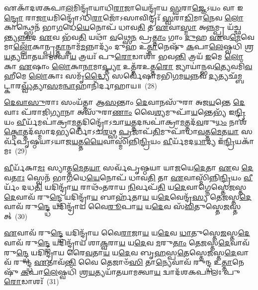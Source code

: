 𑌏𑌕𑌾᳴\-𑌦𑌶\-𑌕𑌪𑌾\-\ul{𑌲}\-𑌮𑌿𑌨𑍍𑌦𑍍𑌰𑌾᳴𑌯𑌾𑌧𑌿\-\ul{𑌰𑌾}\-𑌜𑌾𑌯𑍇𑌨𑍍𑌦𑍍𑌰𑌾᳴𑌯 \ul{𑌸𑍍𑌵}\-𑌰𑌾\-\ul{𑌜𑍍𑌞𑍇}\-\-𑌽𑌯𑌂 𑌵𑌾 𑌇\-\ul{𑌨𑍍𑌦𑍍𑌰𑍋} 𑌰𑌾\-\ul{𑌜𑌾}\-𑌯𑌮𑌿𑌨𑍍𑌦𑍍𑌰𑍋᳴\-𑌽𑌧𑌿\-\ul{𑌰𑌾}\-𑌜𑍋᳴\-𑌽𑌸𑌾𑌵𑌿𑌨𑍍𑌦𑍍𑌰𑌃᳴ \ul{𑌸𑍍𑌵}\-𑌰𑌾\-\ul{𑌡𑌿}\-𑌮𑌾\-\ul{𑌨𑍇}\-𑌵 \ul{𑌲𑍋}\-𑌕𑌾𑌨𑍍𑌥𑍍𑌸𑍍𑌵𑍇𑌨᳴ 𑌭𑌾\-\ul{𑌗}\-𑌧𑍇\-\ul{𑌯𑍇}\-𑌨𑍋𑌪᳴ 𑌧𑌾𑌵\-\ul{𑌤𑌿} 𑌤 \ul{𑌏}\-𑌵𑌾\-\ul{𑌸𑍍𑌮𑌾} 𑌅\-\ul{𑌨𑍍𑌨}\-𑌮𑍍𑌪𑍍𑌰 𑌯᳴𑌚𑍍𑌛𑌨𑍍𑌤𑍍𑌯\-\ul{𑌨𑍍𑌨𑌾}\-𑌦 \ul{𑌏}\-𑌵 𑌭᳴𑌵\-\ul{𑌤𑌿} 𑌯𑌥𑌾᳴ \ul{𑌵}\-𑌥𑍍𑌸𑍇\-\ul{𑌨} 𑌪𑍍𑌰\-\ul{𑌤𑍍𑌤𑌾𑌂} 𑌗𑌾𑌂 \ul{𑌦𑍁}\-𑌹 \ul{𑌏}\-𑌵\-\ul{𑌮𑍇}\-𑌵𑍇𑌮𑌾\-\ul{𑌲𑍍𑌲𑍋𑌁}\-𑌕𑌾𑌨𑍍𑌪𑍍𑌰\-\ul{𑌤𑍍𑌤𑌾}\-𑌨𑍍𑌕𑌾𑌮᳴\-\ul{𑌮}\-𑌨𑍍𑌨𑌾𑌦𑍍𑌯𑌂᳴ 𑌦𑍁𑌹 𑌉\-\ul{𑌤𑍍𑌤𑌾}\-𑌨𑍇𑌷𑍁᳴ \ul{𑌕}\-𑌪𑌾\-\ul{𑌲𑍇}\-𑌷𑍍𑌵𑌧𑌿᳴ 𑌶𑍍𑌰\-\ul{𑌯}\-𑌤𑍍𑌯𑌯𑌾᳴𑌤𑌯𑌾𑌮𑌤𑍍𑌵𑌾\-\ul{𑌯} 𑌤𑍍𑌰𑌯𑌃᳴ 𑌪𑍁\-\ul{𑌰𑍋}\-𑌡𑌾𑌶𑌾᳴ 𑌭𑌵\-\ul{𑌨𑍍𑌤𑌿} 𑌤𑍍𑌰𑌯᳴ \ul{𑌇}\-𑌮𑍇 \ul{𑌲𑍋}\-𑌕𑌾 \ul{𑌏}\-𑌷𑌾𑌂 \ul{𑌲𑍋}\-𑌕𑌾\-\ul{𑌨𑌾}\-𑌮𑌾\-\ul{𑌪𑍍𑌤𑍍𑌯𑌾} 𑌉𑌤𑍍𑌤᳴𑌰𑌉𑌤𑍍𑌤\-\ul{𑌰𑍋} 𑌜𑍍𑌯𑌾𑌯𑌾॑𑌨𑍍𑌭𑌵\-\ul{𑌤𑍍𑌯𑍇}\-𑌵𑌮𑌿᳴\-\ul{𑌵} 𑌹𑍀𑌮𑍇 \ul{𑌲𑍋}\-𑌕𑌾𑌃 𑌸𑌮𑍃᳴\-\ul{𑌦𑍍𑌧𑍍𑌯𑍈} 𑌸𑌰𑍍𑌵𑍇᳴𑌷𑌾𑌮𑌭𑌿\-\ul{𑌗}\-𑌮\-\ul{𑌯}\-𑌨𑍍𑌨𑌵᳴ \ul{𑌦𑍍𑌯}\-𑌤𑍍𑌯𑌛᳴𑌮𑍍𑌬𑌟𑍍𑌕𑌾𑌰\-\ul{𑌵𑍍𑌵𑍍𑌯𑌁}\-𑌤𑍍𑌯𑌾\-\ul{𑌸}\-𑌮\-\ul{𑌨𑍍𑌵𑌾}\-𑌹𑌾𑌨𑌿᳴𑌰𑍍𑌦𑌾𑌹𑌾𑌯॥~(28)

{\anuvakamend[{\-\ul{𑌪𑍁}\-\-\ul{𑌰𑍋}\-𑌡𑌾\-\ul{𑌶}\-𑌨𑍍𑌤𑍍𑌰\-\ul{𑌯𑌃} 𑌷𑌡𑍍𑌵𑌿𑍞᳴𑌶𑌤𑌿𑌶𑍍𑌚}]}%

\-\ul{𑌦𑍇}\-\-\ul{𑌵𑌾}\-\-\ul{𑌸𑍁}\-𑌰𑌾𑌃 𑌸𑌂𑌯᳴𑌤𑍍𑌤𑌾 𑌆\-\ul{𑌸}\-𑌨𑍍𑌤𑌾𑌂 \ul{𑌦𑍇}\-𑌵𑌾𑌨𑌸𑍁᳴𑌰𑌾 𑌅𑌜\-\ul{𑌯}\-𑌨𑍍𑌤𑍇 \ul{𑌦𑍇}\-𑌵𑌾𑌃 𑌪᳴𑌰𑌾𑌜𑌿\-\ul{𑌗𑍍𑌯𑌾}\-𑌨𑌾 𑌅𑌸𑍁᳴𑌰𑌾\-\ul{𑌣𑌾𑌂} 𑌵𑍈\-\ul{𑌶𑍍𑌯}\-𑌮𑍁𑌪𑌾᳴\-\ul{𑌯}\-𑌨𑍍𑌤𑍇𑌭𑍍𑌯᳴ 𑌇\-\ul{𑌨𑍍𑌦𑍍𑌰𑌿}\-𑌯𑌂 \ul{𑌵𑍀}\-𑌰𑍍𑌯᳴𑌮𑌪𑌾॑𑌕𑍍𑌰𑌾\-\ul{𑌮}\-𑌤𑍍𑌤𑌦𑌿𑌨𑍍𑌦𑍍𑌰𑍋᳴\-𑌽𑌚𑌾\-\ul{𑌯}\-𑌤𑍍𑌤𑌦𑌨𑍍𑌵𑌪𑌾॑𑌕𑍍𑌰𑌾\-\ul{𑌮}\-𑌤𑍍𑌤𑌦᳴\-\ul{𑌵}\-𑌰𑍁\-\ul{𑌧𑌂} 𑌨𑌾𑌶᳴\-\ul{𑌕𑍍𑌨𑍋}\-𑌤𑍍𑌤𑌦᳴𑌸𑍍𑌮𑌾𑌦\-\ul{𑌭𑍍𑌯}\-𑌰𑍍𑌧𑍋᳴\-𑌽𑌚\-\ul{𑌰}\-𑌥𑍍𑌸 \ul{𑌪𑍍𑌰}\-𑌜𑌾𑌪᳴\-\ul{𑌤𑌿}\-𑌮𑍁𑌪𑌾᳴𑌧𑌾\-\ul{𑌵}\-𑌤𑍍𑌤\-\ul{𑌮𑍇}\-𑌤\-\ul{𑌯𑌾} 𑌸𑌰𑍍𑌵᳴𑌪𑍃𑌷𑍍𑌠𑌯𑌾\-𑌽𑌯𑌾𑌜\-\ul{𑌯}\-𑌤𑍍𑌤\-\ul{𑌯𑍈}\-𑌵𑌾𑌸𑍍𑌮𑌿᳴𑌨𑍍𑌨𑌿\-\ul{𑌨𑍍𑌦𑍍𑌰𑌿}\-𑌯𑌂 \ul{𑌵𑍀}\-𑌰𑍍𑌯᳴𑌮𑌦\-\ul{𑌧𑌾}\-𑌦𑍍𑌯 𑌇᳴\-\ul{𑌨𑍍𑌦𑍍𑌰𑌿}\-𑌯𑌕𑌾᳴𑌮𑌃~(29)

\-\ul{𑌵𑍀}\-𑌰𑍍𑌯᳴𑌕𑌾\-\ul{𑌮𑌃} 𑌸𑍍𑌯𑌾𑌤𑍍𑌤\-\ul{𑌮𑍇}\-𑌤\-\ul{𑌯𑌾} 𑌸𑌰𑍍𑌵᳴𑌪𑍃𑌷𑍍𑌠𑌯𑌾 𑌯𑌾𑌜𑌯𑍇\-\ul{𑌦𑍇}\-𑌤𑌾 \ul{𑌏}\-𑌵 \ul{𑌦𑍇}\-𑌵\-\ul{𑌤𑌾𑌃} 𑌸𑍍𑌵𑍇𑌨᳴ 𑌭𑌾\-\ul{𑌗}\-𑌧𑍇\-\ul{𑌯𑍇}\-𑌨𑍋𑌪᳴ 𑌧𑌾𑌵\-\ul{𑌤𑌿} 𑌤𑌾 \ul{𑌏}\-𑌵𑌾𑌸𑍍𑌮𑌿᳴𑌨𑍍𑌨𑌿\-\ul{𑌨𑍍𑌦𑍍𑌰𑌿}\-𑌯𑌂 \ul{𑌵𑍀}\-𑌰𑍍𑌯𑌂᳴ 𑌦𑌧\-\ul{𑌤𑌿} 𑌯𑌦𑌿𑌨𑍍𑌦𑍍𑌰𑌾᳴\-\ul{𑌯} 𑌰𑌾𑌥𑌂᳴𑌤𑌰𑌾𑌯 \ul{𑌨𑌿}\-𑌰𑍍𑌵𑌪᳴\-\ul{𑌤𑌿} 𑌯\-\ul{𑌦𑍇}\-𑌵𑌾𑌗𑍍𑌨𑍇𑌸𑍍𑌤𑍇\-\ul{𑌜}\-𑌸𑍍𑌤\-\ul{𑌦𑍇}\-𑌵𑌾𑌵᳴ 𑌰𑍁\-\ul{𑌨𑍍𑌦𑍍𑌧𑍇} 𑌯𑌦𑌿𑌨𑍍𑌦𑍍𑌰𑌾᳴\-\ul{𑌯} 𑌬𑌾𑌰𑍍\mbox{}𑌹᳴𑌤𑌾\-\ul{𑌯} 𑌯\-\ul{𑌦𑍇}\-𑌵𑍇𑌨𑍍𑌦𑍍𑌰᳴\-\ul{𑌸𑍍𑌯} 𑌤𑍇\-\ul{𑌜}\-𑌸𑍍𑌤\-\ul{𑌦𑍇}\-𑌵𑌾𑌵᳴ 𑌰𑍁\-\ul{𑌨𑍍𑌦𑍍𑌧𑍇} 𑌯𑌦𑌿𑌨𑍍𑌦𑍍𑌰𑌾᳴𑌯 𑌵𑍈\-\ul{𑌰𑍂}\-𑌪𑌾\-\ul{𑌯} 𑌯\-\ul{𑌦𑍇}\-𑌵 𑌸᳴\-\ul{𑌵𑌿}\-𑌤𑍁𑌸𑍍𑌤𑍇\-\ul{𑌜}\-𑌸𑍍𑌤𑌤𑍍~(30)

\-\ul{𑌏}\-𑌵𑌾𑌵᳴ 𑌰𑍁\-\ul{𑌨𑍍𑌦𑍍𑌧𑍇} 𑌯𑌦𑌿𑌨𑍍𑌦𑍍𑌰𑌾᳴𑌯 𑌵𑍈\-\ul{𑌰𑌾}\-𑌜𑌾\-\ul{𑌯} 𑌯\-\ul{𑌦𑍇}\-𑌵 \ul{𑌧𑌾}\-𑌤𑍁𑌸𑍍𑌤𑍇\-\ul{𑌜}\-𑌸𑍍𑌤\-\ul{𑌦𑍇}\-𑌵𑌾𑌵᳴ 𑌰𑍁\-\ul{𑌨𑍍𑌦𑍍𑌧𑍇} 𑌯𑌦𑌿𑌨𑍍𑌦𑍍𑌰𑌾᳴𑌯 𑌶𑌾\-\ul{𑌕𑍍𑌵}\-𑌰𑌾\-\ul{𑌯} 𑌯\-\ul{𑌦𑍇}\-𑌵 \ul{𑌮}\-𑌰𑍁\-\ul{𑌤𑌾𑌂} 𑌤𑍇\-\ul{𑌜}\-𑌸𑍍𑌤\-\ul{𑌦𑍇}\-𑌵𑌾𑌵᳴ 𑌰𑍁\-\ul{𑌨𑍍𑌦𑍍𑌧𑍇} 𑌯𑌦𑌿𑌨𑍍𑌦𑍍𑌰𑌾᳴𑌯 𑌰𑍈\-\ul{𑌵}\-𑌤𑌾\-\ul{𑌯} 𑌯\-\ul{𑌦𑍇}\-𑌵 𑌬𑍃\-\ul{𑌹}\-𑌸𑍍𑌪\-\ul{𑌤𑍇}\-𑌸𑍍𑌤𑍇\-\ul{𑌜}\-𑌸𑍍𑌤\-\ul{𑌦𑍇}\-𑌵𑌾𑌵᳴ 𑌰𑍁𑌨𑍍𑌦𑍍𑌧 \ul{𑌏}\-𑌤𑌾𑌵᳴\-\ul{𑌨𑍍𑌤𑌿} 𑌵𑍈 𑌤𑍇𑌜𑌾𑍞᳴\-\ul{𑌸𑌿} 𑌤𑌾\-\ul{𑌨𑍍𑌯𑍇}\-𑌵𑌾𑌵᳴ 𑌰𑍁𑌨𑍍𑌦𑍍𑌧 𑌉\-\ul{𑌤𑍍𑌤𑌾}\-𑌨𑍇𑌷𑍁᳴ \ul{𑌕}\-𑌪𑌾\-\ul{𑌲𑍇}\-𑌷𑍍𑌵𑌧𑌿᳴ 𑌶𑍍𑌰\-\ul{𑌯}\-𑌤𑍍𑌯𑌯𑌾᳴𑌤𑌯𑌾𑌮𑌤𑍍𑌵𑌾\-\ul{𑌯} 𑌦𑍍𑌵𑌾𑌦᳴𑌶\-𑌕𑌪𑌾𑌲𑌃 𑌪𑍁\-\ul{𑌰𑍋}\-𑌡𑌾𑌶𑌃᳴~(31)

